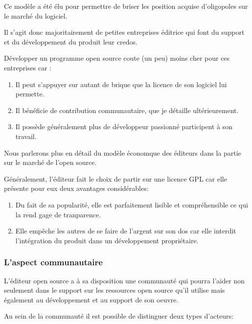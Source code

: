 			Ce modèle a été élu pour permettre de briser les position acquise d'oligopoles sur le marché du logiciel.

			Il s'agit donc majoritairement de petites entreprises éditrice qui font du support et du développement du produit leur credos.

			Développer un programme open source coute (un peu) moins cher pour ces entreprises car :

			\begin{enumerate}[font=\color{burntorange}]

		 		\item Il peut s'appuyer sur autant de brique que la licence de son logiciel lui permette.
		 		\item Il bénéficie de contribution communautaire, que je détaille ultérieurement.
			 	\item Il possède généralement plus de développeur passionné participent à son travail.

			\end{enumerate}

			Nous parlerons plus en détail du modèle économque des éditeurs dans la partie sur le marché de l'open source.

			Généralement, l'éditeur fait le choix de partir sur une licence GPL car elle présente pour eux deux avantages considérables:


			\begin{enumerate}[font=\color{burntorange}]

		 		\item Du fait de sa popularité, elle est parfaitement lisible et compréhensible ce qui la rend gage de tranparence.
		 		\item Elle empêche les autres de se faire de l'argent sur son dos car elle interdit l'intégration du produit dans un développement propriétaire.

			\end{enumerate}

			\subsubsection{L'aspect communautaire}

			L'éditeur open source a à sa disposition une communauté qui pourra l'aider non seulement dans le support sur les ressources open source qu'il utilise mais également au développement et au support de son oeuvre.

			Au sein de la communauté il est possible de distinguer deux types d'acteurs:

